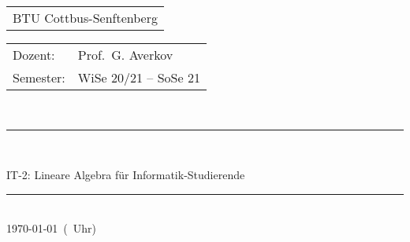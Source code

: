 
\begin{tabular}{l}
BTU Cottbus-Senftenberg
\end{tabular}

\vspace{2cm}

\begin{tabular}{ll}
	Dozent: & Prof.~G. Averkov
\\  Semester: & WiSe 20/21 -- SoSe 21
\end{tabular}
\vspace{3cm}
\\
\rule{\linewidth}{0.5mm}\\[0.4cm]
\begin{huge}
IT-2: Lineare Algebra für Informatik-Studierende \\
\end{huge}
\rule{\linewidth}{0.5mm}\\[1.5cm]
%
\today\ (\thistime\ Uhr)




\thispagestyle{empty}


\newpage
